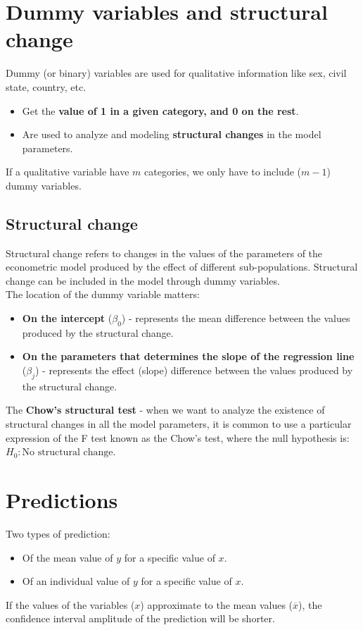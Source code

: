 \documentclass[10pt, a4paper, landscape]{extarticle}
\begin{document}
\begin{multicols}{3}
\section*{Dummy variables and structural change}
	Dummy (or binary) variables are used for qualitative information like sex, civil state, country, etc.
	\begin{itemize}[leftmargin=*]
		\item Get the \textbf{value of 1 in a given category, and 0 on the rest}.
		\item Are used to analyze and modeling \textbf{structural changes} in the model parameters.
	\end{itemize}
	If a qualitative variable have $m$ categories, we only have to include ($m-1$) dummy variables.
	\subsection*{Structural change}
		Structural change refers to changes in the values of the parameters of the econometric model produced by the effect of different sub-populations. Structural change can be included in the model through dummy variables. \\
		The location of the dummy variable matters:
		\begin{itemize}[leftmargin=*]
			\item \textbf{On the intercept} ($\beta_0$) - represents the mean difference between the values produced by the structural change.
			\item \textbf{On the parameters that determines the slope of the regression line} ($\beta_j$) - represents the effect (slope) difference between the values produced by the structural change.
		\end{itemize}
		The \textbf{Chow's structural test} - when we want to analyze the existence of structural changes in all the model parameters, it is common to use a particular expression of the F test known as the Chow's test, where the null hypothesis is: $H_0: \text{No structural change}$.

\section*{Predictions}
	Two types of prediction:
	\begin{itemize}[leftmargin=*]
		\item Of the mean value of $y$ for a specific value of $x$.
		\item Of an individual value of $y$ for a specific value of $x$.
	\end{itemize}
	If the values of the variables ($x$) approximate to the mean values ($\overline{x}$), the confidence interval amplitude of the prediction will be shorter. 
\columnbreak

\end{multicols}
\end{document}
